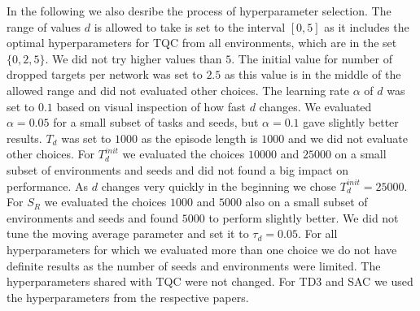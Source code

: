 In the following we also desribe the process of hyperparameter selection.
The range of values $d$ is allowed to take is set to the interval $[0,5]$ as it includes the optimal hyperparameters for TQC from all environments, which are in the set $\{0,2,5\}$. We did not try higher values than $5$.
The initial value for number of dropped targets per network was set to $2.5$ as this value is in the middle of the allowed range and did not evaluated other choices.
The learning rate $\alpha$ of $d$ was set to $0.1$ based on visual inspection of how fast $d$ changes. We  evaluated $\alpha=0.05$ for a small subset of tasks and seeds, but $\alpha=0.1$ gave slightly better results.
$T_d$ was set to $1000$ as the episode length is $1000$ and we did not evaluate other choices.
For $T_d^{init}$ we evaluated the choices $10000$ and $25000$ on a small subset of environments and seeds and did not found a big impact on performance. As $d$ changes very quickly in the beginning we chose $T_d^{init}=25000$.
For $S_R$ we evaluated the choices $1000$ and $5000$ also on a small subset of environments and seeds and found $5000$ to perform slightly better.
We did not tune the moving average parameter and set it to $\tau_d = 0.05$.
For all hyperparameters for which we evaluated more than one choice we do not have definite results as the number of seeds and environments were limited.
The hyperparameters shared with TQC were not changed.
For TD3 and SAC we used the hyperparameters from the respective papers.




